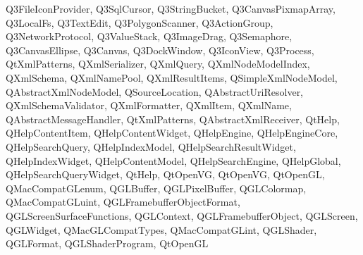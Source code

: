 {{    Q3FileIconProvider,%
    Q3SqlCursor,%
    Q3StringBucket,%
    Q3CanvasPixmapArray,%
    Q3LocalFs,%
    Q3TextEdit,%
    Q3PolygonScanner,%
    Q3ActionGroup,%
    Q3NetworkProtocol,%
    Q3ValueStack,%
    Q3ImageDrag,%
    Q3Semaphore,%
    Q3CanvasEllipse,%
    Q3Canvas,%
    Q3DockWindow,%
    Q3IconView,%
    Q3Process,%
    QtXmlPatterns,%
    QXmlSerializer,%
    QXmlQuery,%
    QXmlNodeModelIndex,%
    QXmlSchema,%
    QXmlNamePool,%
    QXmlResultItems,%
    QSimpleXmlNodeModel,%
    QAbstractXmlNodeModel,%
    QSourceLocation,%
    QAbstractUriResolver,%
    QXmlSchemaValidator,%
    QXmlFormatter,%
    QXmlItem,%
    QXmlName,%
    QAbstractMessageHandler,%
    QtXmlPatterns,%
    QAbstractXmlReceiver,%
    QtHelp,%
    QHelpContentItem,%
    QHelpContentWidget,%
    QHelpEngine,%
    QHelpEngineCore,%
    QHelpSearchQuery,%
    QHelpIndexModel,%
    QHelpSearchResultWidget,%
    QHelpIndexWidget,%
    QHelpContentModel,%
    QHelpSearchEngine,%
    QHelpGlobal,%
    QHelpSearchQueryWidget,%
    QtHelp,%
    QtOpenVG,%
    QtOpenVG,%
    QtOpenGL,%
    QMacCompatGLenum,%
    QGLBuffer,%
    QGLPixelBuffer,%
    QGLColormap,%
    QMacCompatGLuint,%
    QGLFramebufferObjectFormat,%
    QGLScreenSurfaceFunctions,%
    QGLContext,%
    QGLFramebufferObject,%
    QGLScreen,%
    QGLWidget,%
    QMacGLCompatTypes,%
    QMacCompatGLint,%
    QGLShader,%
    QGLFormat,%
    QGLShaderProgram,%
    QtOpenGL%
  }
}
